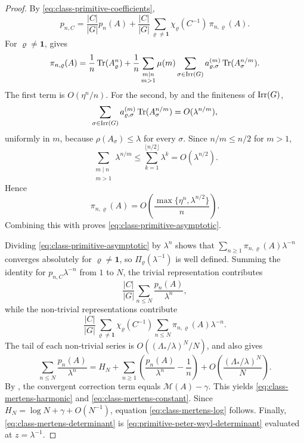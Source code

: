 \begin{proof}
  By \eqref{eq:class-primitive-coefficients},
  \[
    p_{n,C}
    =
    \frac{|C|}{|G|}p_n(A)
    +\frac{|C|}{|G|}
      \sum_{\varrho\neq\mathbf 1}
        \chi_\varrho(C^{-1})\,\pi_{n,\varrho}(A).
  \]
  For \(\varrho\neq\mathbf 1\), 
  gives
  \[
    \pi_{n,\varrho}(A)
    =
    \frac{1}{n}\operatorname{Tr}(A_\varrho^n)
    +\frac{1}{n}
      \sum_{\substack{m\mid n\\ m>1}}\mu(m)
        \sum_{\sigma\in\operatorname{Irr}(G)}
          a_{\varrho,\sigma}^{(m)}\operatorname{Tr}(A_\sigma^{n/m}).
  \]
  The first term is \(O(\eta^n/n)\). For the second, by
   and the finiteness of
  \(\operatorname{Irr}(G)\),
  \[
    \sum_{\sigma\in\operatorname{Irr}(G)}
      a_{\varrho,\sigma}^{(m)}\operatorname{Tr}(A_\sigma^{n/m})
    =O(\lambda^{n/m}),
  \]
  uniformly in \(m\), because \(\rho(A_\sigma)\le \lambda\) for every
  \(\sigma\). Since \(n/m\le n/2\) for \(m>1\),
  \[
    \sum_{\substack{m\mid n\\ m>1}}\lambda^{n/m}
    \le \sum_{k=1}^{\lfloor n/2\rfloor}\lambda^k
    =O(\lambda^{n/2}).
  \]
  Hence
  \[
    \pi_{n,\varrho}(A)
    =O\!\left(\frac{\max\{\eta^n,\lambda^{n/2}\}}{n}\right).
  \]
  Combining this with  proves
  \eqref{eq:class-primitive-asymptotic}.

  Dividing \eqref{eq:class-primitive-asymptotic} by \(\lambda^n\) shows
  that \(\sum_{n\ge 1}\pi_{n,\varrho}(A)\lambda^{-n}\) converges
  absolutely for \(\varrho\neq\mathbf 1\), so
  \(\Pi_\varrho(\lambda^{-1})\) is well defined. Summing the identity
  for \(p_{n,C}\lambda^{-n}\) from \(1\) to \(N\), the trivial
  representation contributes
  \[
    \frac{|C|}{|G|}
      \sum_{n\le N}\frac{p_n(A)}{\lambda^n},
  \]
  while the non-trivial representations contribute
  \[
    \frac{|C|}{|G|}
      \sum_{\varrho\neq\mathbf 1}\chi_\varrho(C^{-1})
      \sum_{n\le N}\pi_{n,\varrho}(A)\lambda^{-n}.
  \]
  The tail of each non-trivial series is
  \(O((\Lambda_*/\lambda)^N/N)\), and
   also gives
  \[
    \sum_{n\le N}\frac{p_n(A)}{\lambda^n}
    =
    H_N+\sum_{n\ge 1}\left(\frac{p_n(A)}{\lambda^n}-\frac{1}{n}\right)
    +O\!\left(\frac{(\Lambda_*/\lambda)^N}{N}\right).
  \]
  By , the convergent
  correction term equals \(\mathcal M(A)-\gamma\). This yields
  \eqref{eq:class-mertens-harmonic} and
  \eqref{eq:class-mertens-constant}. Since
  \(H_N=\log N+\gamma+O(N^{-1})\), equation
  \eqref{eq:class-mertens-log} follows. Finally,
  \eqref{eq:class-mertens-determinant} is
  \eqref{eq:primitive-peter-weyl-determinant} evaluated at
  \(z=\lambda^{-1}\).
\end{proof}

